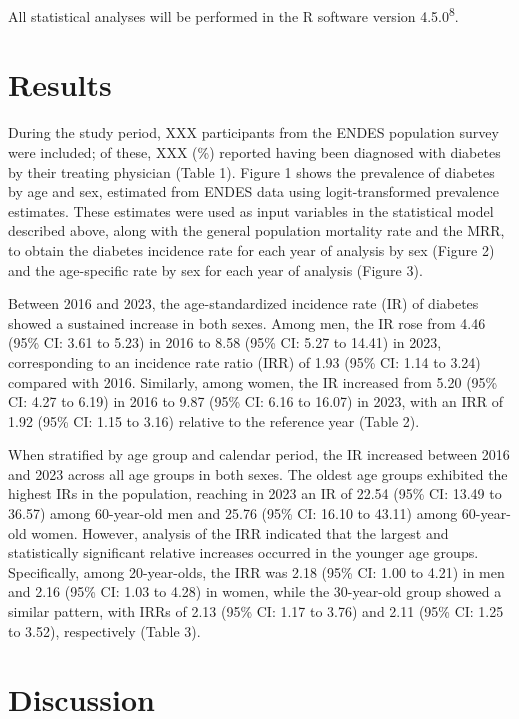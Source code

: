 \documentclass[
  letterpaper,
  DIV=11,
  numbers=noendperiod]{scrartcl}
\begin{document}
All statistical analyses will be performed in the R software version
4.5.0\textsuperscript{8}.

\section{Results}\label{results-1}

During the study period, XXX participants from the ENDES population
survey were included; of these, XXX (\%) reported having been diagnosed
with diabetes by their treating physician (Table 1). Figure 1 shows the
prevalence of diabetes by age and sex, estimated from ENDES data using
logit-transformed prevalence estimates. These estimates were used as
input variables in the statistical model described above, along with the
general population mortality rate and the MRR, to obtain the diabetes
incidence rate for each year of analysis by sex (Figure 2) and the
age-specific rate by sex for each year of analysis (Figure 3).

Between 2016 and 2023, the age-standardized incidence rate (IR) of
diabetes showed a sustained increase in both sexes. Among men, the IR
rose from 4.46 (95\% CI: 3.61 to 5.23) in 2016 to 8.58 (95\% CI: 5.27 to
14.41) in 2023, corresponding to an incidence rate ratio (IRR) of 1.93
(95\% CI: 1.14 to 3.24) compared with 2016. Similarly, among women, the
IR increased from 5.20 (95\% CI: 4.27 to 6.19) in 2016 to 9.87 (95\% CI:
6.16 to 16.07) in 2023, with an IRR of 1.92 (95\% CI: 1.15 to 3.16)
relative to the reference year (Table 2).

When stratified by age group and calendar period, the IR increased
between 2016 and 2023 across all age groups in both sexes. The oldest
age groups exhibited the highest IRs in the population, reaching in 2023
an IR of 22.54 (95\% CI: 13.49 to 36.57) among 60-year-old men and 25.76
(95\% CI: 16.10 to 43.11) among 60-year-old women. However, analysis of
the IRR indicated that the largest and statistically significant
relative increases occurred in the younger age groups. Specifically,
among 20-year-olds, the IRR was 2.18 (95\% CI: 1.00 to 4.21) in men and
2.16 (95\% CI: 1.03 to 4.28) in women, while the 30-year-old group
showed a similar pattern, with IRRs of 2.13 (95\% CI: 1.17 to 3.76) and
2.11 (95\% CI: 1.25 to 3.52), respectively (Table 3).

\section{Discussion}\label{discussion}
\end{document}
